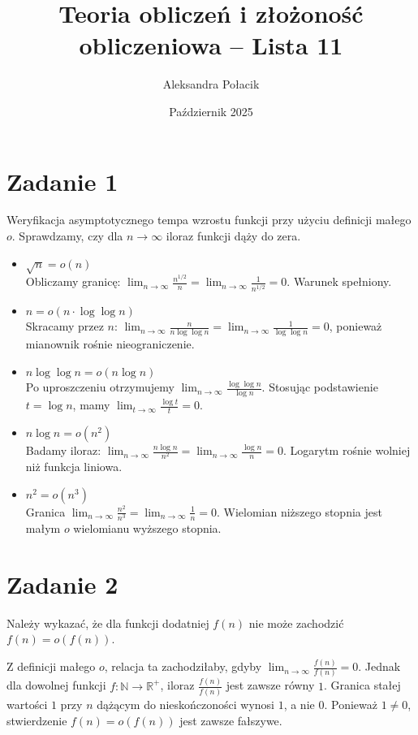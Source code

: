 \documentclass{article}
\title{Teoria obliczeń i złożoność obliczeniowa -- Lista 11}
\author{Aleksandra Połacik}
\date{Październik 2025}
\begin{document}
\maketitle

\section{Zadanie 1}
Weryfikacja asymptotycznego tempa wzrostu funkcji przy użyciu definicji małego $o$. Sprawdzamy, czy dla $n \to \infty$ iloraz funkcji dąży do zera.

\begin{itemize}
    \item[(a)] $\sqrt{n} = o(n)$ \\
    Obliczamy granicę: $\lim_{n \to \infty} \frac{n^{1/2}}{n} = \lim_{n \to \infty} \frac{1}{n^{1/2}} = 0$. Warunek spełniony.

    \item[(b)] $n = o(n \cdot \log \log n)$ \\
    Skracamy przez $n$: $\lim_{n \to \infty} \frac{n}{n \log \log n} = \lim_{n \to \infty} \frac{1}{\log \log n} = 0$, ponieważ mianownik rośnie nieograniczenie.

    \item[(c)] $n \log \log n = o(n \log n)$ \\
    Po uproszczeniu otrzymujemy $\lim_{n \to \infty} \frac{\log \log n}{\log n}$. Stosując podstawienie $t = \log n$, mamy $\lim_{t \to \infty} \frac{\log t}{t} = 0$.

    \item[(d)] $n \log n = o(n^2)$ \\
    Badamy iloraz: $\lim_{n \to \infty} \frac{n \log n}{n^2} = \lim_{n \to \infty} \frac{\log n}{n} = 0$. Logarytm rośnie wolniej niż funkcja liniowa.

    \item[(e)] $n^2 = o(n^3)$ \\
    Granica $\lim_{n \to \infty} \frac{n^2}{n^3} = \lim_{n \to \infty} \frac{1}{n} = 0$. Wielomian niższego stopnia jest małym $o$ wielomianu wyższego stopnia.
\end{itemize}

\section{Zadanie 2}
Należy wykazać, że dla funkcji dodatniej $f(n)$ nie może zachodzić $f(n) = o(f(n))$.

Z definicji małego $o$, relacja ta zachodziłaby, gdyby $\lim_{n \to \infty} \frac{f(n)}{f(n)} = 0$. Jednak dla dowolnej funkcji $f: \mathbb{N} \to \mathbb{R}^+$, iloraz $\frac{f(n)}{f(n)}$ jest zawsze równy $1$. Granica stałej wartości $1$ przy $n$ dążącym do nieskończoności wynosi $1$, a nie $0$. Ponieważ $1 \neq 0$, stwierdzenie $f(n) = o(f(n))$ jest zawsze fałszywe.
\end{document}
